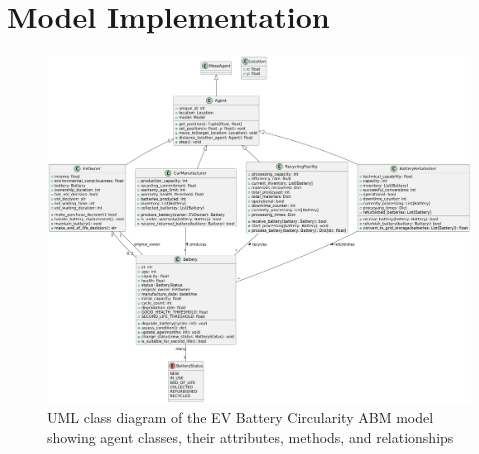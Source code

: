 \appendix
\section{Model Implementation}

\begin{figure}[ht]
    \centering
    \includegraphics[scale=0.3]{figures/planttext uml.png}
    \caption{UML class diagram of the EV Battery Circularity ABM model showing agent classes, their attributes, methods, and relationships}
    \label{fig:class_diagram}
\end{figure}